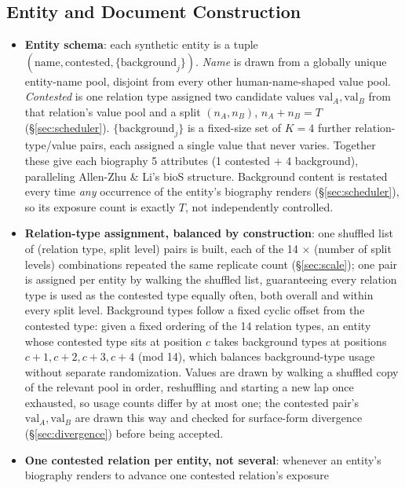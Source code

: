 \documentclass[11pt]{article}
\begin{document}
\subsection{Entity and Document Construction}
\label{sec:entity}

\begin{itemize}
  \item \textbf{Entity schema}: each synthetic entity is a tuple
    $(\text{name}, \text{contested}, \{\text{background}_j\})$. \emph{Name}
    is drawn from a globally unique entity-name pool, disjoint from every
    other human-name-shaped value pool. \emph{Contested} is one relation type
    assigned two candidate values $\text{val}_A, \text{val}_B$ from that
    relation's value pool and a split $(n_A, n_B)$, $n_A + n_B = T$
    (\S\ref{sec:scheduler}). $\{\text{background}_j\}$ is a fixed-size set of
    $K=4$ further relation-type/value pairs, each assigned a single value
    that never varies. Together these give each biography 5 attributes
    (1 contested $+$ 4 background), paralleling Allen-Zhu \& Li's bioS
    structure. Background content is restated every time \emph{any}
    occurrence of the entity's biography renders (\S\ref{sec:scheduler}), so
    its exposure count is exactly $T$, not independently controlled.
  \item \textbf{Relation-type assignment, balanced by construction}: one
    shuffled list of (relation type, split level) pairs is built, each of the
    14 $\times$ (number of split levels) combinations repeated the same
    replicate count (\S\ref{sec:scale}); one pair is assigned per entity by
    walking the shuffled list, guaranteeing every relation type is used as
    the contested type equally often, both overall and within every split
    level. Background types follow a fixed cyclic offset from the contested
    type: given a fixed ordering of the 14 relation types, an entity whose
    contested type sits at position $c$ takes background types at positions
    $c{+}1, c{+}2, c{+}3, c{+}4$ (mod 14), which balances background-type
    usage without separate randomization. Values are drawn by walking a
    shuffled copy of the relevant pool in order, reshuffling and starting a
    new lap once exhausted, so usage counts differ by at most one; the
    contested pair's $\text{val}_A, \text{val}_B$ are drawn this way and
    checked for surface-form divergence (\S\ref{sec:divergence}) before being
    accepted.
  \item \textbf{One contested relation per entity, not several}: whenever an
    entity's biography renders to advance one contested relation's exposure

\end{itemize}
\end{document}
